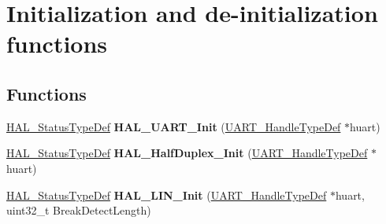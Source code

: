 \hypertarget{group___u_a_r_t___exported___functions___group1}{}\section{Initialization and de-\/initialization functions}
\label{group___u_a_r_t___exported___functions___group1}
\subsection*{Functions}
\begin{DoxyCompactItemize}
\item 
\mbox{\label{group___u_a_r_t___exported___functions___group1_gabe47045024787099b0bfa82bbe7b0b6a}} 
\mbox{\hyperlink{stm32f7xx__hal__def_8h_a63c0679d1cb8b8c684fbb0632743478f}{H\+A\+L\+\_\+\+Status\+Type\+Def}} {\bfseries H\+A\+L\+\_\+\+U\+A\+R\+T\+\_\+\+Init} (\mbox{\hyperlink{group___u_a_r_t___exported___types_ga7adf4f3e4c3ecde572be5925c915a967}{U\+A\+R\+T\+\_\+\+Handle\+Type\+Def}} $\ast$huart)
\item 
\mbox{\label{group___u_a_r_t___exported___functions___group1_ga927245827265eff1f3580a0121efd424}} 
\mbox{\hyperlink{stm32f7xx__hal__def_8h_a63c0679d1cb8b8c684fbb0632743478f}{H\+A\+L\+\_\+\+Status\+Type\+Def}} {\bfseries H\+A\+L\+\_\+\+Half\+Duplex\+\_\+\+Init} (\mbox{\hyperlink{group___u_a_r_t___exported___types_ga7adf4f3e4c3ecde572be5925c915a967}{U\+A\+R\+T\+\_\+\+Handle\+Type\+Def}} $\ast$huart)
\item 
\mbox{\label{group___u_a_r_t___exported___functions___group1_ga27e4497270bd06434e3965e4b06f5516}} 
\mbox{\hyperlink{stm32f7xx__hal__def_8h_a63c0679d1cb8b8c684fbb0632743478f}{H\+A\+L\+\_\+\+Status\+Type\+Def}} {\bfseries H\+A\+L\+\_\+\+L\+I\+N\+\_\+\+Init} (\mbox{\hyperlink{group___u_a_r_t___exported___types_ga7adf4f3e4c3ecde572be5925c915a967}{U\+A\+R\+T\+\_\+\+Handle\+Type\+Def}} $\ast$huart, uint32\+\_\+t Break\+Detect\+Length)
\item 
\mbox{\label{group___u_a_r_t___exported___functions___group1_gaae1b49f0cb62235141807d8cbc61bc4d}} 

\end{DoxyCompactItemize}
